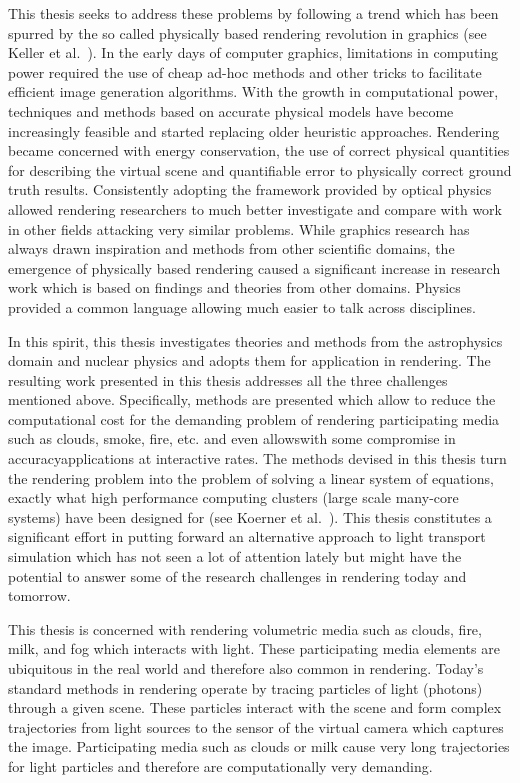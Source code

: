 This thesis seeks to address these problems by following a trend which has been spurred by the so called physically based rendering revolution in graphics (see Keller et al.~\cite{Keller15}). In the early days of computer graphics, limitations in computing power required the use of cheap ad-hoc methods and other tricks to facilitate efficient image generation algorithms. With the growth in computational power, techniques and methods based on accurate physical models have become increasingly feasible and started replacing older heuristic approaches. Rendering became concerned with energy conservation, the use of correct physical quantities for describing the virtual scene and quantifiable error to physically correct ground truth results. Consistently adopting the framework provided by optical physics allowed rendering researchers to much better investigate and compare with work in other fields attacking very similar problems. While graphics research has always drawn inspiration and methods from other scientific domains, the emergence of physically based rendering caused a significant increase in research work which is based on findings and theories from other domains. Physics provided a common language allowing much easier to talk across disciplines.

In this spirit, this thesis investigates theories and methods from the astrophysics domain and nuclear physics and adopts them for application in rendering. The resulting work presented in this thesis addresses all the three challenges mentioned above. Specifically, methods are presented which allow to reduce the computational cost for the demanding problem of rendering participating media such as clouds, smoke, fire, etc. and even allows\mydash with some compromise in accuracy\mydash applications at interactive rates. The methods devised in this thesis turn the rendering problem into the problem of solving a linear system of equations, exactly what high performance computing clusters (large scale many-core systems) have been designed for (see Koerner et al.~\cite{Koerner17}). This thesis constitutes a significant effort in putting forward an alternative approach to light transport simulation which has not seen a lot of attention lately but might have the potential to answer some of the research challenges in rendering today and tomorrow.


This thesis is concerned with rendering volumetric media such as clouds, fire, milk, and fog which interacts with light. These participating media elements are ubiquitous in the real world and therefore also common in rendering. Today's standard methods in rendering operate by tracing particles of light (photons) through a given scene. These particles interact with the scene and form complex trajectories from light sources to the sensor of the virtual camera which captures the image. Participating media such as clouds or milk cause very long trajectories for light particles and therefore are computationally very demanding.


